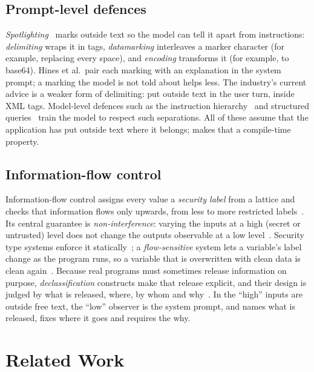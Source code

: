 \documentclass[journal]{IEEEtran}
\begin{document}
\subsection{Prompt-level defences}
\emph{Spotlighting}~\cite{hines2024spotlighting} marks outside text so the model can tell it apart from instructions: \emph{delimiting} wraps it in tags, \emph{datamarking} interleaves a marker character (for example, replacing every space), and \emph{encoding} transforms it (for example, to base64). Hines et al.\ pair each marking with an explanation in the system prompt; a marking the model is not told about helps less. The industry's current advice is a weaker form of delimiting: put outside text in the user turn, inside XML tags. Model-level defences such as the instruction hierarchy~\cite{wallace2024hierarchy} and structured queries~\cite{chen2025struq} train the model to respect such separations. All of these assume that the application has put outside text where it belongs; \TL{} makes that a compile-time property.

\subsection{Information-flow control}
Information-flow control assigns every value a \emph{security label} from a lattice and checks that information flows only upwards, from less to more restricted labels~\cite{denning1976lattice}. Its central guarantee is \emph{non-interference}: varying the inputs at a high (secret or untrusted) level does not change the outputs observable at a low level~\cite{goguen1982security}. Security type systems enforce it statically~\cite{volpano1996sound,sabelfeld2003language}; a \emph{flow-sensitive} system lets a variable's label change as the program runs, so a variable that is overwritten with clean data is clean again~\cite{hunt2006flow}. Because real programs must sometimes release information on purpose, \emph{declassification} constructs make that release explicit, and their design is judged by what is released, where, by whom and why~\cite{sabelfeld2009declassification}. In \TL{} the ``high'' inputs are outside free text, the ``low'' observer is the system prompt, and  names what is released, fixes where it goes and requires the why.

\section{Related Work}\label{sec:lit}
\end{document}
